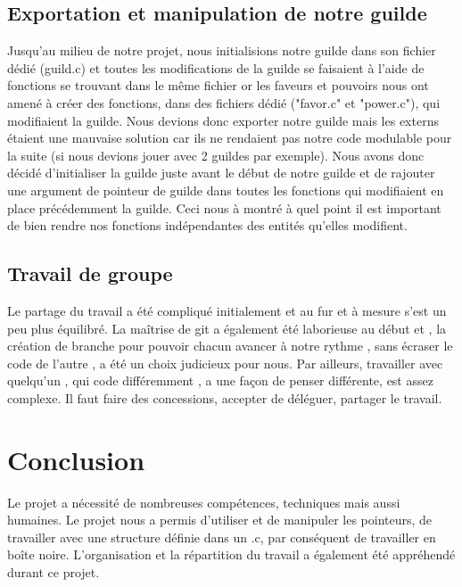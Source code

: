 \documentclass{article}
\begin{document}
            
    
    \subsection{Exportation et manipulation de notre guilde}
        Jusqu'au milieu de notre projet, nous initialisions notre guilde dans son fichier dédié (guild.c) et toutes les modifications de la guilde se faisaient à l'aide de fonctions se trouvant dans le même fichier or les faveurs et pouvoirs nous ont amené à créer des fonctions, dans des fichiers dédié ("favor.c" et "power.c"),  qui modifiaient la guilde. Nous devions donc exporter notre guilde mais les externs étaient une mauvaise solution car ils ne rendaient pas notre code modulable pour la suite (si nous devions jouer avec 2 guildes par exemple). Nous avons donc décidé d'initialiser la guilde juste avant le début de notre guilde et de rajouter une argument de pointeur de guilde dans toutes les fonctions qui modifiaient en place précédemment la guilde. Ceci nous à montré à quel point il est important de bien rendre nos fonctions indépendantes des entités qu'elles modifient.
        
        
    \subsection{Travail de groupe}
    \hspace{1em} Le partage du travail a été compliqué initialement et au fur et à mesure s'est un peu plus équilibré. La maîtrise de git a également été laborieuse au début et , la création de branche pour pouvoir chacun avancer à notre rythme , sans écraser le code de l'autre , a été un choix judicieux pour nous. Par ailleurs, travailler avec quelqu'un , qui code différemment , a une façon de penser différente, est assez complexe. Il faut faire des concessions, accepter de déléguer, partager le travail.

    
\section{Conclusion}
 \hspace{1em} Le projet a nécessité de nombreuses compétences, techniques mais aussi humaines. Le projet nous a permis d'utiliser et de manipuler les pointeurs, de travailler avec une structure définie dans un .c, par conséquent de travailler en boîte noire. L'organisation et la répartition du travail a également été appréhendé durant ce projet.
\end{document}
